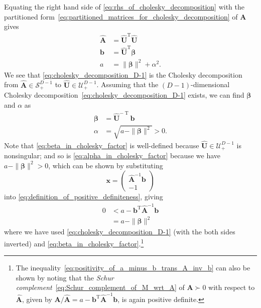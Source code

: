 \documentclass[12pt,a4paper]{article}
\begin{document}
Equating the right hand side of \eqref{eq:rhs_of_cholesky_decomposition} with
the partitioned form~\eqref{eq:partitioned_matrices_for_cholesky_decomposition} of $\mathbf{A}$
gives
\begin{align}
\widehat{\mathbf{A}} &= \widehat{\mathbf{U}}^{\operatorname{T}} \widehat{\mathbf{U}}
\label{eq:cholesky_decomposition_D-1} \\
\mathbf{b} &= \widehat{\mathbf{U}}^{\operatorname{T}} \bm{\beta} \\
a &= \|\bm{\beta}\|^{2} + \alpha^{2} .
\end{align}
We see that \eqref{eq:cholesky_decomposition_D-1} is
the Cholesky decomposition from $\widehat{\mathbf{A}} \in \mathcal{S}_{+}^{D - 1}$
to $\widehat{\mathbf{U}} \in \mathcal{U}_{+}^{D - 1}$.
Assuming that
the $(D - 1)$-dimensional Cholesky decomposition~\eqref{eq:cholesky_decomposition_D-1} exists,
we can find $\bm{\beta}$ and $\alpha$ as
\begin{align}
\bm{\beta} &= \widehat{\mathbf{U}}^{-\operatorname{T}} \mathbf{b}
\label{eq:beta_in_cholesky_factor} \\
\alpha &= \sqrt{a - \|\bm{\beta}\|^{2}} > 0
\label{eq:alpha_in_cholesky_factor} .
\end{align}
Note that \eqref{eq:beta_in_cholesky_factor} is well-defined because
$\widehat{\mathbf{U}} \in \mathcal{U}_{+}^{D - 1}$ is nonsingular; and
so is \eqref{eq:alpha_in_cholesky_factor} because we have $a - \|\bm{\beta}\|^{2} > 0$,
which can be shown by substituting
\begin{equation}
\mathbf{x} =
\begin{pmatrix}
\widehat{\mathbf{A}}^{-1} \mathbf{b} \\
-1
\end{pmatrix}
\end{equation}
into \eqref{eq:definition_of_positive_definiteness}, giving
\begin{align}
0 &< a - \mathbf{b}^{\operatorname{T}} \widehat{\mathbf{A}}^{-1} \mathbf{b}
\label{eq:positivity_of_a_minus_b_trans_A_inv_b} \\
&= a - \|\bm{\beta}\|^{2}
\end{align}
where we have used \eqref{eq:cholesky_decomposition_D-1} (with the both sides inverted) and
\eqref{eq:beta_in_cholesky_factor}.\footnote{%
The inequality~\eqref{eq:positivity_of_a_minus_b_trans_A_inv_b} can also be shown by noting that
the \emph{Schur complement}~\eqref{eq:Schur_complement_of_M_wrt_A}
of $\mathbf{A} \succ 0$ with respect to $\widehat{\mathbf{A}}$, given by
$\mathbf{A}/\widehat{\mathbf{A}}
= a - \mathbf{b}^{\operatorname{T}} \widehat{\mathbf{A}}^{-1} \mathbf{b}$,
is again positive definite.}
\end{document}
